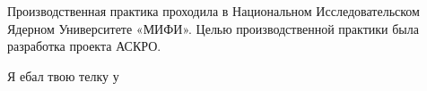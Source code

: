 \label{sec:introduction}

Производственная практика проходила в Национальном Исследовательском Ядерном Университете «МИФИ». Целью производственной практики была 
разработка проекта АСКРО.

Я ебал твою телку у